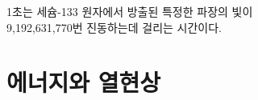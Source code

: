 \documentclass[article,chapter,openany,amsmath,gremph,lwarp]{oblivoir}
\begin{document}
\begin{flushleft}
       \begin{defn}[1초]
       1초는 세슘-133 원자에서 방출된 특정한 파장의 빛이 \\9,192,631,770번 진동하는데 걸리는 시간이다.
       \end{defn}

\end{flushleft}









\part{에너지와 열현상}
\pagestyle{MyRuled}

% 
\end{document}
